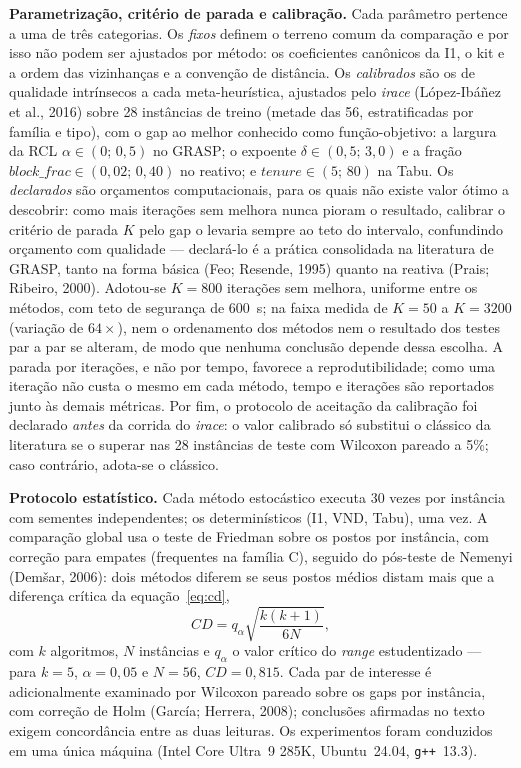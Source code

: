 \documentclass[10pt,a4paper]{article}
\begin{document}
\vspace{\baselineskip}
\textbf{Parametrização, critério de parada e calibração.} Cada parâmetro pertence a uma de três categorias. Os \emph{fixos} definem o terreno comum da comparação e por isso não podem ser ajustados por método: os coeficientes canônicos da I1, o kit e a ordem das vizinhanças e a convenção de distância. Os \emph{calibrados} são os de qualidade intrínsecos a cada meta-heurística, ajustados pelo \textit{irace} (L\'opez-Ib\'a\~nez et al., 2016) sobre 28 instâncias de treino (metade das 56, estratificadas por família e tipo), com o gap ao melhor conhecido como função-objetivo: a largura da RCL $\alpha\in(0;\,0{,}5)$ no GRASP; o expoente $\delta\in(0{,}5;\,3{,}0)$ e a fração $\mathit{block\_frac}\in(0{,}02;\,0{,}40)$ no reativo; e $\mathit{tenure}\in(5;\,80)$ na Tabu. Os \emph{declarados} são orçamentos computacionais, para os quais não existe valor ótimo a descobrir: como mais iterações sem melhora nunca pioram o resultado, calibrar o critério de parada $K$ pelo gap o levaria sempre ao teto do intervalo, confundindo orçamento com qualidade --- declará-lo é a prática consolidada na literatura de GRASP, tanto na forma básica (Feo; Resende, 1995) quanto na reativa (Prais; Ribeiro, 2000). Adotou-se $K=800$ iterações sem melhora, uniforme entre os métodos, com teto de segurança de 600~s; na faixa medida de $K=50$ a $K=3200$ (variação de $64\times$), nem o ordenamento dos métodos nem o resultado dos testes par a par se alteram, de modo que nenhuma conclusão depende dessa escolha. A parada por iterações, e não por tempo, favorece a reprodutibilidade; como uma iteração não custa o mesmo em cada método, tempo e iterações são reportados junto às demais métricas. Por fim, o protocolo de aceitação da calibração foi declarado \emph{antes} da corrida do \textit{irace}: o valor calibrado só substitui o clássico da literatura se o superar nas 28 instâncias de teste com Wilcoxon pareado a 5\%; caso contrário, adota-se o clássico.

\vspace{\baselineskip}
\textbf{Protocolo estatístico.} Cada método estocástico executa 30 vezes por instância com sementes independentes; os determinísticos (I1, VND, Tabu), uma vez. A comparação global usa o teste de Friedman sobre os postos por instância, com correção para empates (frequentes na família C), seguido do pós-teste de Nemenyi (Dem\v{s}ar, 2006): dois métodos diferem se seus postos médios distam mais que a diferença crítica da equação~\eqref{eq:cd},
\begin{equation}
CD=q_{\alpha}\sqrt{\frac{k(k+1)}{6N}},
\label{eq:cd}
\end{equation}
com $k$ algoritmos, $N$ instâncias e $q_{\alpha}$ o valor crítico do \textit{range} estudentizado --- para $k=5$, $\alpha=0{,}05$ e $N=56$, $CD=0{,}815$. Cada par de interesse é adicionalmente examinado por Wilcoxon pareado sobre os gaps por instância, com correção de Holm (Garc\'ia; Herrera, 2008); conclusões afirmadas no texto exigem concordância entre as duas leituras. Os experimentos foram conduzidos em uma única máquina (Intel Core Ultra~9 285K, Ubuntu~24.04, \texttt{g++}~13.3).
\end{document}
